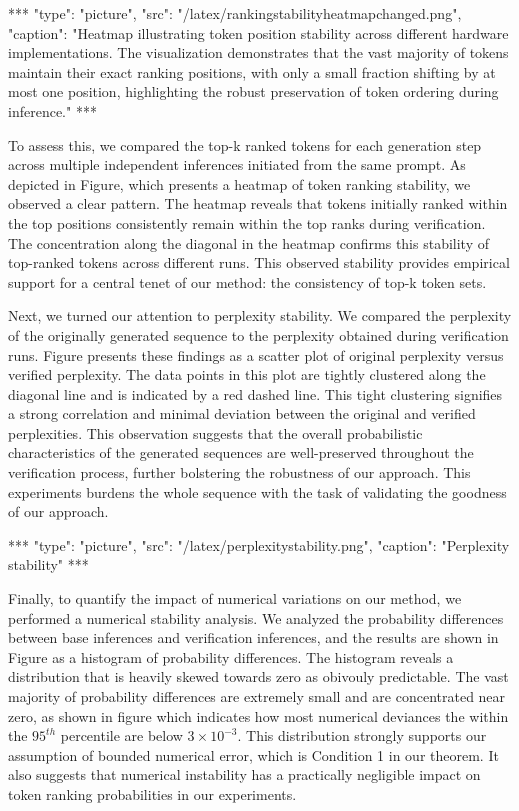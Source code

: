 \documentclass{article}
\begin{document}
\begin{center}
***
"type": "picture",
"src": "/latex/rankingstabilityheatmapchanged.png",
"caption": "Heatmap illustrating token position stability across different hardware implementations. The visualization demonstrates that the vast majority of tokens maintain their exact ranking positions, with only a small fraction shifting by at most one position, highlighting the robust preservation of token ordering during inference."
***
\end{center}

To assess this, we compared the top-k ranked tokens for each generation step across multiple independent inferences initiated from the same prompt. As depicted in Figure, which presents a heatmap of token ranking stability, we observed a clear pattern. The heatmap reveals that tokens initially ranked within the top positions consistently remain within the top ranks during verification.  The concentration along the diagonal in the heatmap confirms this stability of top-ranked tokens across different runs. This observed stability provides empirical support for a central tenet of our method: the consistency of top-k token sets.

Next, we turned our attention to perplexity stability. We compared the perplexity of the originally generated sequence to the perplexity obtained during verification runs. Figure presents these findings as a scatter plot of original perplexity versus verified perplexity. The data points in this plot are tightly clustered along the diagonal line and is indicated by a red dashed line. This tight clustering signifies a strong correlation and minimal deviation between the original and verified perplexities. This observation suggests that the overall probabilistic characteristics of the generated sequences are well-preserved throughout the verification process, further bolstering the robustness of our approach.  This experiments burdens the whole sequence with the task of validating the goodness of our approach.

\begin{center}
***
"type": "picture",
"src": "/latex/perplexitystability.png",
"caption": "Perplexity stability"
***
\end{center}

Finally, to quantify the impact of numerical variations on our method, we performed a numerical stability analysis.  We analyzed the probability differences between base inferences and verification inferences, and the results are shown in Figure as a histogram of probability differences. The histogram reveals a distribution that is heavily skewed towards zero as obivouly predictable. The vast majority of probability differences are extremely small and are concentrated near zero, as shown in figure which indicates how most numerical deviances the within the $95^{th}$ percentile are below $3 \times 10^{-3}$. This distribution strongly supports our assumption of bounded numerical error, which is Condition 1 in our theorem. It also suggests that numerical instability has a practically negligible impact on token ranking probabilities in our experiments.
\end{document}
